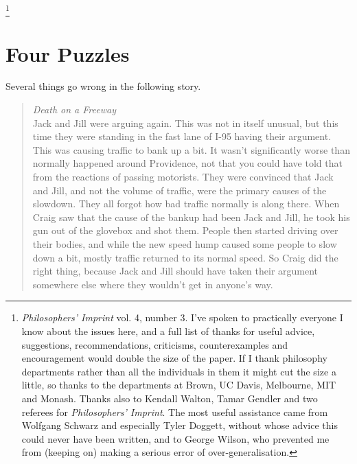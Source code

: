 \footnote{\textit{Philosophers' Imprint} vol. 4, number 3. I've spoken to practically everyone I know about the issues here, and a full list of thanks for useful advice, suggestions, recommendations, criticisms, counterexamples and encouragement would double the size of the paper. If I thank philosophy departments rather than all the individuals in them it might cut the size a little, so thanks to the departments at Brown, UC Davis, Melbourne, MIT and Monash. Thanks also to Kendall Walton, Tamar Gendler and two referees for \textit{Philosophers' Imprint}. The most useful assistance came from Wolfgang Schwarz and especially Tyler Doggett, without whose advice this could never have been written, and to George Wilson, who prevented me from (keeping on) making a serious error of over-generalisation. }

\section{Four Puzzles}
Several things go wrong in the following story.

\begin{quote}
\textit{Death on a Freeway} \\
Jack and Jill were arguing again. This was not in itself unusual, but this time they were standing in the fast lane of I-95 having their argument. This was causing traffic to bank up a bit. It wasn't significantly worse than normally happened around Providence, not that you could have told that from the reactions of passing motorists. They were convinced that Jack and Jill, and not the volume of traffic, were the primary causes of the slowdown. They all forgot how bad traffic normally is along there. When Craig saw that the cause of the bankup had been Jack and Jill, he took his gun out of the glovebox and shot them. People then started driving over their bodies, and while the new speed hump caused some people to slow down a bit, mostly traffic returned to its normal speed. So Craig did the right thing, because Jack and Jill should have taken their argument somewhere else where they wouldn't get in anyone's way.
\end{quote}

